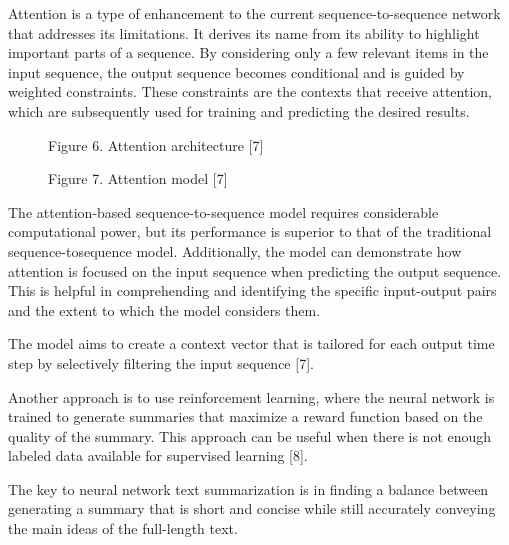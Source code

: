 \documentclass [a4paper, 10pt, twocolumn] {article}
\begin{document}
Attention is a type of enhancement to the current
sequence-to-sequence network that addresses its limitations. It derives its name from its ability to highlight
important parts of a sequence. By considering only a
few relevant items in the input sequence, the output
sequence becomes conditional and is guided by weighted
constraints. These constraints are the contexts that receive
attention, which are subsequently used for training and
predicting the desired results.
\begin{figure}[H]
	\caption*{Figure 6. Attention architecture [7]}
	\caption*{Figure 7. Attention model [7]}
\end{figure}

The attention-based sequence-to-sequence model requires considerable computational power, but its performance is superior to that of the traditional sequence-tosequence model. Additionally, the model can demonstrate
how attention is focused on the input sequence when
predicting the output sequence. This is helpful in comprehending and identifying the specific input-output pairs
and the extent to which the model considers them.

The model aims to create a context vector that is
tailored for each output time step by selectively filtering
the input sequence [7].

Another approach is to use reinforcement learning,
where the neural network is trained to generate summaries
that maximize a reward function based on the quality of
the summary. This approach can be useful when there is
not enough labeled data available for supervised learning
[8].

The key to neural network text summarization is in
finding a balance between generating a summary that is
short and concise while still accurately conveying the
main ideas of the full-length text.
\end{document}
